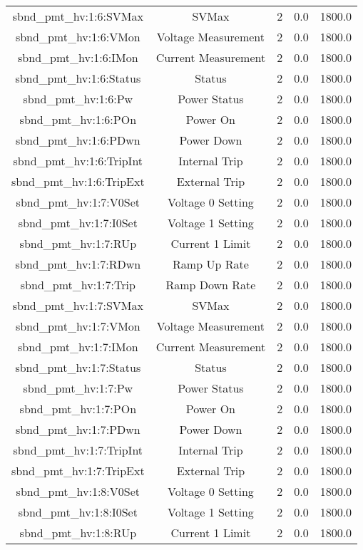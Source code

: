 \begin{center}
\begin{longtable}{c | c c c c }
sbnd\_pmt\_hv:1:6:SVMax & SVMax & 2 & 0.0 & 1800.0\\ 
sbnd\_pmt\_hv:1:6:VMon & Voltage Measurement & 2 & 0.0 & 1800.0\\ 
sbnd\_pmt\_hv:1:6:IMon & Current Measurement & 2 & 0.0 & 1800.0\\ 
sbnd\_pmt\_hv:1:6:Status & Status & 2 & 0.0 & 1800.0\\ 
sbnd\_pmt\_hv:1:6:Pw & Power Status & 2 & 0.0 & 1800.0\\ 
sbnd\_pmt\_hv:1:6:POn & Power On & 2 & 0.0 & 1800.0\\ 
sbnd\_pmt\_hv:1:6:PDwn & Power Down & 2 & 0.0 & 1800.0\\ 
sbnd\_pmt\_hv:1:6:TripInt & Internal Trip & 2 & 0.0 & 1800.0\\ 
sbnd\_pmt\_hv:1:6:TripExt & External Trip & 2 & 0.0 & 1800.0\\ 
sbnd\_pmt\_hv:1:7:V0Set & Voltage 0 Setting & 2 & 0.0 & 1800.0\\ 
sbnd\_pmt\_hv:1:7:I0Set & Voltage 1 Setting & 2 & 0.0 & 1800.0\\ 
sbnd\_pmt\_hv:1:7:RUp & Current 1 Limit & 2 & 0.0 & 1800.0\\ 
sbnd\_pmt\_hv:1:7:RDwn & Ramp Up Rate & 2 & 0.0 & 1800.0\\ 
sbnd\_pmt\_hv:1:7:Trip & Ramp Down Rate & 2 & 0.0 & 1800.0\\ 
sbnd\_pmt\_hv:1:7:SVMax & SVMax & 2 & 0.0 & 1800.0\\ 
sbnd\_pmt\_hv:1:7:VMon & Voltage Measurement & 2 & 0.0 & 1800.0\\ 
sbnd\_pmt\_hv:1:7:IMon & Current Measurement & 2 & 0.0 & 1800.0\\ 
sbnd\_pmt\_hv:1:7:Status & Status & 2 & 0.0 & 1800.0\\ 
sbnd\_pmt\_hv:1:7:Pw & Power Status & 2 & 0.0 & 1800.0\\ 
sbnd\_pmt\_hv:1:7:POn & Power On & 2 & 0.0 & 1800.0\\ 
sbnd\_pmt\_hv:1:7:PDwn & Power Down & 2 & 0.0 & 1800.0\\ 
sbnd\_pmt\_hv:1:7:TripInt & Internal Trip & 2 & 0.0 & 1800.0\\ 
sbnd\_pmt\_hv:1:7:TripExt & External Trip & 2 & 0.0 & 1800.0\\ 
sbnd\_pmt\_hv:1:8:V0Set & Voltage 0 Setting & 2 & 0.0 & 1800.0\\ 
sbnd\_pmt\_hv:1:8:I0Set & Voltage 1 Setting & 2 & 0.0 & 1800.0\\ 
sbnd\_pmt\_hv:1:8:RUp & Current 1 Limit & 2 & 0.0 & 1800.0\\ 

\end{longtable}
\end{center}
